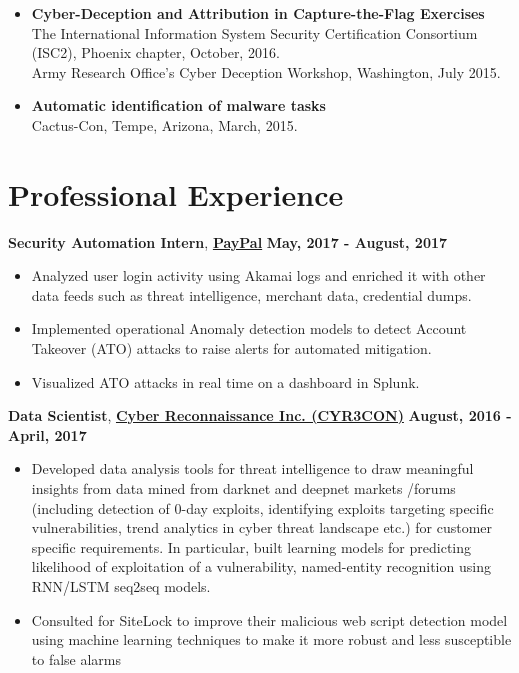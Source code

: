 \documentclass[margin,line]{CV}
\begin{document}
\begin{resume}
\begin{itemize}[leftmargin =*]
\item {\bf Cyber-Deception and Attribution in Capture-the-Flag Exercises}\\
The International Information System Security Certification Consortium (ISC2), Phoenix chapter, October, 2016.\\
Army Research Office's Cyber Deception Workshop, Washington, July 2015.

\item {\bf Automatic identification of malware tasks}\\
Cactus-Con, Tempe, Arizona, March, 2015.
\end{itemize}


\section{\sc Professional Experience}
{\bf Security Automation Intern}, \href{https://www.paypal.com/us/home}{\bf PayPal}  \hfill {\bf May, 2017 - August, 2017}
\begin{itemize}
    \item Analyzed user login activity using Akamai logs and enriched it with other data feeds such as threat intelligence, merchant data, credential dumps.
	\item Implemented operational Anomaly detection models to detect Account Takeover (ATO) attacks to raise alerts for automated mitigation.  
	\item Visualized ATO attacks in real time on a dashboard in Splunk.
	
\end{itemize}


{\bf Data Scientist}, \href{http://www.cyr3con.com/}{\bf Cyber Reconnaissance Inc. (CYR3CON)}  \hfill {\bf August, 2016 - April, 2017}
\begin{itemize}
	 \item Developed data analysis tools for threat intelligence to draw meaningful insights from data
	 mined from darknet and deepnet markets /forums (including detection of 0-day exploits, identifying
	 exploits targeting specific vulnerabilities, trend analytics in cyber threat landscape etc.)
	 for customer specific requirements. In particular, built learning models for predicting likelihood of exploitation of a vulnerability,  named-entity recognition using RNN/LSTM seq2seq models.
	 
	 \item Consulted for SiteLock to improve their malicious web script detection model using machine learning techniques to make it more robust and less susceptible to false alarms
\end{itemize}


\end{resume}
\end{document}
